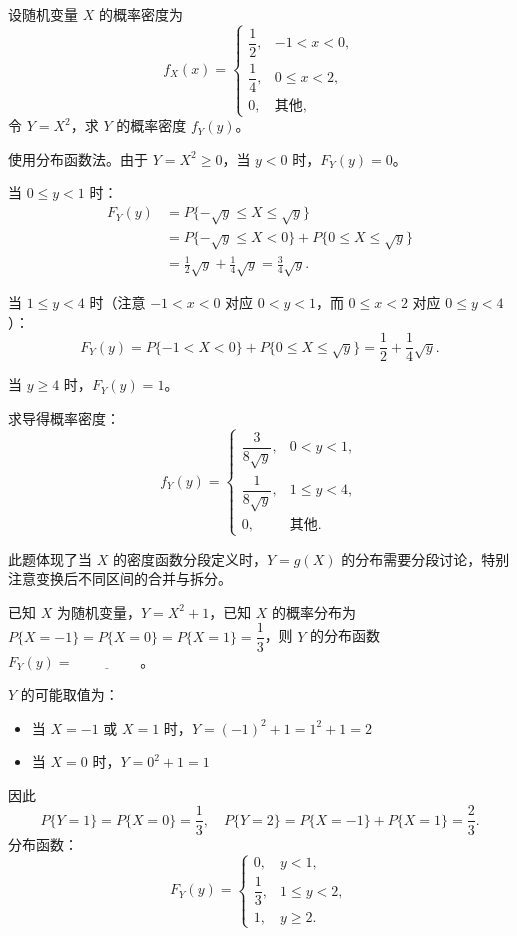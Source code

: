 ﻿\documentclass[lang=cn,11pt]{elegantbook}
\begin{document}
\begin{exercise}[分段密度函数的变换] \label{exer:2-22}
设随机变量 $X$ 的概率密度为
\[
f_X(x) = \begin{cases}
\dfrac{1}{2}, & -1 < x < 0, \\[6pt]
\dfrac{1}{4}, & 0 \le x < 2, \\[6pt]
0, & \text{其他},
\end{cases}
\]
令 $Y = X^2$，求 $Y$ 的概率密度 $f_Y(y)$。
\end{exercise}

\begin{solution}
使用分布函数法。由于 $Y = X^2 \ge 0$，当 $y < 0$ 时，$F_Y(y) = 0$。

当 $0 \le y < 1$ 时：
\[
\begin{aligned}
F_Y(y) &= P\{-\sqrt{y} \le X \le \sqrt{y}\} \\
&= P\{-\sqrt{y} \le X < 0\} + P\{0 \le X \le \sqrt{y}\} \\
&= \frac{1}{2}\sqrt{y} + \frac{1}{4}\sqrt{y} = \frac{3}{4}\sqrt{y}.
\end{aligned}
\]

当 $1 \le y < 4$ 时（注意 $-1 < x < 0$ 对应 $0 < y < 1$，而 $0 \le x < 2$ 对应 $0 \le y < 4$）：
\[
F_Y(y) = P\{-1 < X < 0\} + P\{0 \le X \le \sqrt{y}\} = \frac{1}{2} + \frac{1}{4}\sqrt{y}.
\]

当 $y \ge 4$ 时，$F_Y(y) = 1$。

求导得概率密度：
\[
f_Y(y) = \begin{cases}
\dfrac{3}{8\sqrt{y}}, & 0 < y < 1, \\[6pt]
\dfrac{1}{8\sqrt{y}}, & 1 \le y < 4, \\[6pt]
0, & \text{其他}.
\end{cases}
\]

此题体现了当 $X$ 的密度函数分段定义时，$Y = g(X)$ 的分布需要分段讨论，特别注意变换后不同区间的合并与拆分。
\end{solution}


\begin{exercise}[离散型随机变量函数分布] \label{exer:2-43}
已知 $X$ 为随机变量，$Y=X^2+1$，已知 $X$ 的概率分布为 $P\{X=-1\}=P\{X=0\}=P\{X=1\}=\dfrac{1}{3}$，则 $Y$ 的分布函数 $F_Y(y)=\underline{\hspace{2cm}}$。
\end{exercise}
\begin{solution}
$Y$ 的可能取值为：
\begin{itemize}
    \item 当 $X=-1$ 或 $X=1$ 时，$Y=(-1)^2+1=1^2+1=2$
    \item 当 $X=0$ 时，$Y=0^2+1=1$
\end{itemize}
因此
\[
P\{Y=1\}=P\{X=0\}=\frac{1}{3}, \quad P\{Y=2\}=P\{X=-1\}+P\{X=1\}=\frac{2}{3}.
\]
分布函数：
\[
F_Y(y)=
\begin{cases}
0, & y<1, \\[6pt]
\dfrac{1}{3}, & 1\leqslant y<2, \\[6pt]
1, & y\geqslant2.
\end{cases}
\]
\end{solution}
\end{document}

